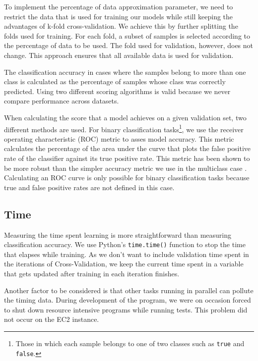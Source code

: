 \documentclass[a4paper,12pt,twoside,openright]{report}
\begin{document}
To implement the percentage of data approximation parameter, we need to restrict the data that is used for training our models while still keeping the advantages of k-fold cross-validation. We achieve this by further splitting the folds used for training. For each fold, a subset of samples is selected according to the percentage of data to be used. The fold used for validation, however, does not change. This approach ensures that all available data is used for validation.

The classification accuracy in cases where the samples belong to more than one class is calculated as the percentage of samples whose class was correctly predicted. Using two different scoring algorithms is valid because we never compare performance across datasets.

When calculating the score that a model achieves on a given validation set, two different methods are used. For binary classification tasks\footnote{Those in which each sample belongs to one of two classes such as \texttt{true} and \texttt{false}.}, we use the receiver operating characteristic (ROC) metric to asses model accuracy. This metric calculates the percentage of the area under the curve that plots the false positive rate of the classifier against its true positive rate. This metric has been shown to be more robust than the simpler accuracy metric we use in the multiclass case \cite{Bradley97theuse}. Calculating an ROC curve is only possible for binary classification tasks because true and false positive rates are not defined in this case.

\subsection{Time}
Measuring the time spent learning is more straightforward than measuring classification accuracy. We use Python's \texttt{time.time()} function to stop the time that elapses while training. As we don't want to include validation time spent in the iterations of Cross-Validation, we keep the current time spent in a variable that gets updated after training in each iteration finishes.

Another factor to be considered is that other tasks running in parallel can pollute the timing data. During development of the program, we were on occasion forced to shut down resource intensive programs while running tests. This problem did not occur on the EC2 instance. %
\end{document}
